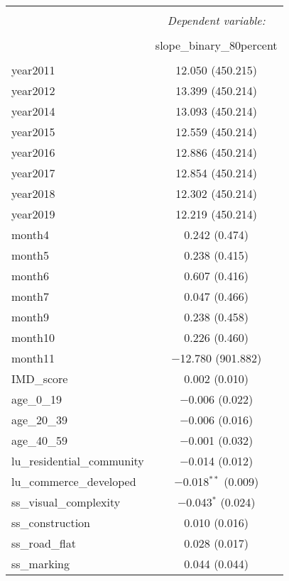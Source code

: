 \begin{table}[!htbp] \centering 
  \caption{} 
  \label{} 
\small 
\begin{tabular}{@{\extracolsep{1pt}}lc} 
\\[-1.8ex]\hline 
\hline \\[-1.8ex] 
 & \multicolumn{1}{c}{\textit{Dependent variable:}} \\ 
\cline{2-2} 
\\[-1.8ex] & slope\_binary\_80percent \\ 
\hline \\[-1.8ex] 
 year2011 & 12.050 (450.215) \\ 
  year2012 & 13.399 (450.214) \\ 
  year2014 & 13.093 (450.214) \\ 
  year2015 & 12.559 (450.214) \\ 
  year2016 & 12.886 (450.214) \\ 
  year2017 & 12.854 (450.214) \\ 
  year2018 & 12.302 (450.214) \\ 
  year2019 & 12.219 (450.214) \\ 
  month4 & 0.242 (0.474) \\ 
  month5 & 0.238 (0.415) \\ 
  month6 & 0.607 (0.416) \\ 
  month7 & 0.047 (0.466) \\ 
  month9 & 0.238 (0.458) \\ 
  month10 & 0.226 (0.460) \\ 
  month11 & $-$12.780 (901.882) \\ 
  IMD\_score & 0.002 (0.010) \\ 
  age\_0\_19 & $-$0.006 (0.022) \\ 
  age\_20\_39 & $-$0.006 (0.016) \\ 
  age\_40\_59 & $-$0.001 (0.032) \\ 
  lu\_residential\_community & $-$0.014 (0.012) \\ 
  lu\_commerce\_developed & $-$0.018$^{**}$ (0.009) \\ 
  ss\_visual\_complexity & $-$0.043$^{*}$ (0.024) \\ 
  ss\_construction & 0.010 (0.016) \\ 
  ss\_road\_flat & 0.028 (0.017) \\ 
  ss\_marking & 0.044 (0.044) \\ 

\end{tabular}
\end{table}
